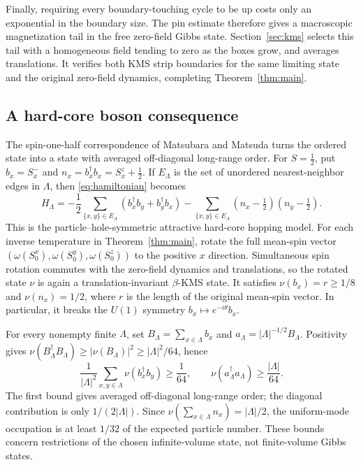Finally, requiring every boundary-touching cycle to be up costs only
an exponential in the boundary size.  The pin estimate therefore gives
a macroscopic magnetization tail in the free zero-field Gibbs state.
Section~\ref{sec:kms} selects this tail with a homogeneous field tending
to zero as the boxes grow, and averages translations.  It verifies both
KMS strip boundaries for the same limiting state and the original
zero-field dynamics, completing Theorem~\ref{thm:main}.

\subsection{A hard-core boson consequence}\label{sec:hard-core}

The spin-one-half correspondence of Matsubara and Matsuda
\cite[Sections~2--3]{MatsubaraMatsuda1956} turns the ordered state into
a state with averaged off-diagonal long-range order.  For $S=\frac12$, put $b_x=S_x^-$ and
$n_x=b_x^\dagger b_x=S_x^z+\frac12$.
If $E_\Lambda$ is the set of unordered nearest-neighbor edges in $\Lambda$,
then \eqref{eq:hamiltonian} becomes
\[
 H_\Lambda
 =-\frac12\sum_{\{x,y\}\in E_\Lambda}
       (b_x^\dagger b_y+b_y^\dagger b_x)
  -\sum_{\{x,y\}\in E_\Lambda}
       (n_x-\tfrac12)(n_y-\tfrac12).
\]
This is the particle--hole-symmetric attractive hard-core hopping model.
For each inverse temperature in Theorem~\ref{thm:main}, rotate the full
mean-spin vector
$(\omega(S_0^x),\omega(S_0^y),\omega(S_0^z))$ to the positive $x$ direction.
Simultaneous spin rotation commutes with the zero-field dynamics and
translations, so the rotated state $\nu$ is again a translation-invariant
$\beta$-KMS state.  It satisfies
$\nu(b_x)=r\ge1/8$ and $\nu(n_x)=1/2$, where $r$ is the length of the
original mean-spin vector.  In particular, it breaks the $U(1)$ symmetry
$b_x\mapsto e^{-i\theta}b_x$.

For every nonempty finite $\Lambda$, set
$B_\Lambda=\sum_{x\in\Lambda}b_x$ and
$a_\Lambda=|\Lambda|^{-1/2}B_\Lambda$.
Positivity gives
$\nu(B_\Lambda^\dagger B_\Lambda)\ge|\nu(B_\Lambda)|^2
\ge|\Lambda|^2/64$, hence
\[
 \frac1{|\Lambda|^2}\sum_{x,y\in\Lambda}\nu(b_x^\dagger b_y)
       \ge\frac1{64},
 \qquad
 \nu(a_\Lambda^\dagger a_\Lambda)\ge\frac{|\Lambda|}{64}.
\]
The first bound gives averaged off-diagonal long-range order; the
diagonal contribution is only $1/(2|\Lambda|)$.
Since $\nu(\sum_{x\in\Lambda}n_x)=|\Lambda|/2$, the uniform-mode occupation
is at least $1/32$ of the expected particle number.
These bounds concern restrictions of the chosen infinite-volume state,
not finite-volume Gibbs states.

